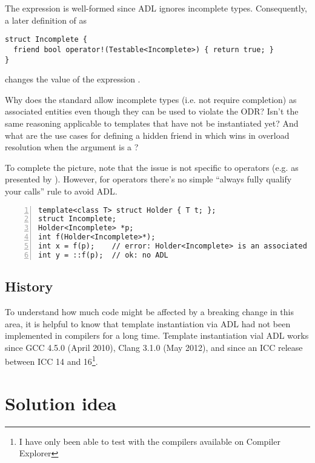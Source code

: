
The expression  is well-formed since ADL ignores incomplete types. Consequently, 
a later definition of  as
\medskip\begin{lstlisting}[style=Vc]
struct Incomplete {
  friend bool operator!(Testable<Incomplete>) { return true; }
}
\end{lstlisting}
changes the value of the expression .

Why does the standard allow incomplete types (i.e. not require completion) as associated 
entities even though they can be used to violate the ODR? Isn't the same reasoning 
applicable to templates that have not be instantiated yet? And what are the use cases for 
defining a hidden friend in  which wins in overload resolution when 
the argument is a ?

To complete the picture, note that the issue is not specific to operators (e.g. 
 as presented by \textcite{P2538R0}). However, for operators there's no 
simple “always fully qualify your calls” rule to avoid ADL.

\begin{lstlisting}[style=Vc,numbers=left,float,label=lst:example2,caption={
Minimal example triggering ill-formed instantiation
}]
template<class T> struct Holder { T t; };
struct Incomplete;
Holder<Incomplete> *p;
int f(Holder<Incomplete>*);
int x = f(p);    // error: Holder<Incomplete> is an associated entity
int y = ::f(p);  // ok: no ADL
\end{lstlisting}

\subsection{History}

To understand how much code might be affected by a breaking change in this area, it is 
helpful to know that template instantiation via ADL had not been implemented in compilers 
for a long time. Template instantiation vial ADL works since GCC 4.5.0 (April 2010), Clang 
3.1.0 (May 2012), and since an ICC release between ICC 14 and 16\footnote{I have only been 
  able to test with the compilers available on Compiler Explorer}.

\pagebreak

\section{Solution idea}

